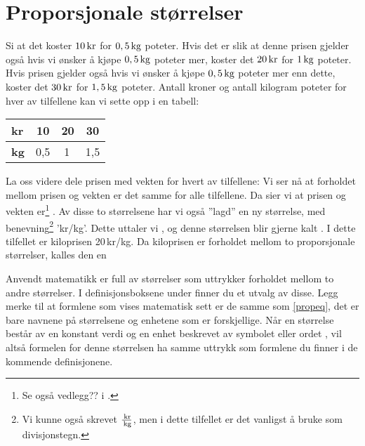 \section{Proporsjonale størrelser \label{Propstorl}}
Si at det koster $ 10\,\textrm{kr}$ for $ 0,5\,\textrm{kg} $ poteter. Hvis det er slik at denne prisen gjelder også hvis vi ønsker å kjøpe $ 0,5\,\textrm{kg} $ poteter mer, koster det $ 20\,\textrm{kr} $ for $ 1\,\textrm{kg} $ poteter. Hvis prisen gjelder også hvis vi ønsker å kjøpe $ 0,5\,\textrm{kg} $ poteter mer enn dette, koster det $ 30\,\textrm{kr} $ for $ 1,5\,\textrm{kg} $ poteter. Antall kroner og antall kilogram poteter for hver av tilfellene kan vi sette opp i en tabell: \vs
\begin{center}
	\begin{tabular}{|l|c|c|c|}
		\hline
\textbf{kr} & 10  & 20 & 30 \\ \hline
\textbf{kg} & 0,5 & 1\,& 1,5 \\ \hline
	\end{tabular}
\end{center}
La oss videre dele prisen med vekten for hvert av tilfellene:
Vi ser nå at forholdet mellom prisen og vekten er det samme for alle tilfellene. Da sier vi at prisen og vekten er\footnote{Se også vedlegg?? i \mb.} . Av disse to størrelsene har vi også ''lagd'' en ny størrelse, med benevning\footnote{Vi kunne også skrevet $ \frac{\,\textrm{kr}}{\,\textrm{kg}} $, men i dette tilfellet er det vanligst å bruke \sym{/} som divisjonstegn.} 'kr/kg'. Dette uttaler vi , og denne størrelsen blir gjerne kalt . I dette tilfellet er kiloprisen 20\,kr/kg. Da kiloprisen er forholdet mellom to proporsjonale størrelser, kalles den en  \regv
{} \regv

Anvendt matematikk er full av størrelser som uttrykker forholdet mellom to andre størrelser. I definisjonsboksene under finner du et utvalg av disse. Legg merke til at formlene som vises matematisk sett er de samme som \eqref{propeq}, det er bare navnene på størrelsene og enhetene som er forskjellige. Når en størrelse består av en konstant verdi og en enhet beskrevet av symbolet \sym{$ / $} eller ordet , vil altså formelen for denne størrelsen ha samme uttrykk som formlene du finner i de kommende definisjonene.
\regv

